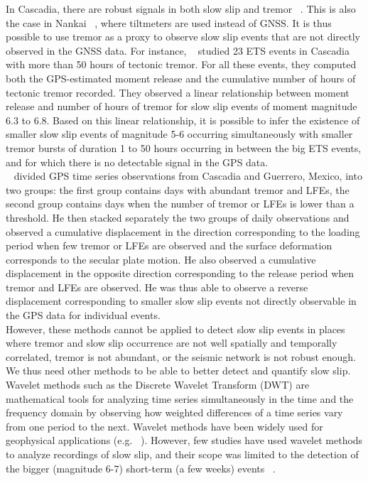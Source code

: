 \documentclass{article}
\begin{document}
In Cascadia, there are robust signals in both slow slip and tremor ~\citep{HAW_2013}. This is also the case in Nankai ~\citep{HIR_2008}, where tiltmeters are used instead of GNSS. It is thus possible to use tremor as a proxy to observe slow slip events that are not directly observed in the GNSS data. For instance, ~\citet{AGU_2009} studied 23 ETS events in Cascadia with more than 50 hours of tectonic tremor. For all these events, they computed both the GPS-estimated moment release and the cumulative number of hours of tectonic tremor recorded. They observed a linear relationship between moment release and number of hours of tremor for slow slip events of moment magnitude 6.3 to 6.8. Based on this linear relationship, it is possible to infer the existence of smaller slow slip events of magnitude 5-6 occurring simultaneously with smaller tremor bursts of duration 1 to 50 hours occurring in between the big ETS events, and for which there is no detectable signal in the GPS data. \\

~\citet{FRA_2016} divided GPS time series observations from Cascadia and Guerrero, Mexico, into two groups: the first group contains days with abundant tremor and LFEs, the second group contains days when the number of tremor or LFEs is lower than a threshold. He then stacked separately the two groups of daily observations and observed a cumulative displacement in the direction corresponding to the loading period when few tremor or LFEs are observed and the surface deformation corresponds to the secular plate motion. He also observed a cumulative displacement in the opposite direction corresponding to the release period when tremor and LFEs are observed. He was thus able to observe a reverse displacement corresponding to smaller slow slip events not directly observable in the GPS data for individual events. \\

However, these methods cannot be applied to detect slow slip events in places where tremor and slow slip occurrence are not well spatially and temporally correlated, tremor is not abundant, or the seismic network is not robust enough. We thus need other methods to be able to better detect and quantify slow slip. \\

Wavelet methods such as the Discrete Wavelet Transform (DWT) are mathematical tools for analyzing time series simultaneously in the time and the frequency domain by observing how weighted differences of a time series vary from one period to the next. Wavelet methods have been widely used for geophysical applications (e.g. ~\citet{KUM_1997}). However, few studies have used wavelet methods to analyze recordings of slow slip, and their scope was limited to the detection of the bigger (magnitude 6-7) short-term (a few weeks) events ~\citep{SZE_2008,OHT_2010,WEI_2012,ALB_2019}. \\
\end{document}
